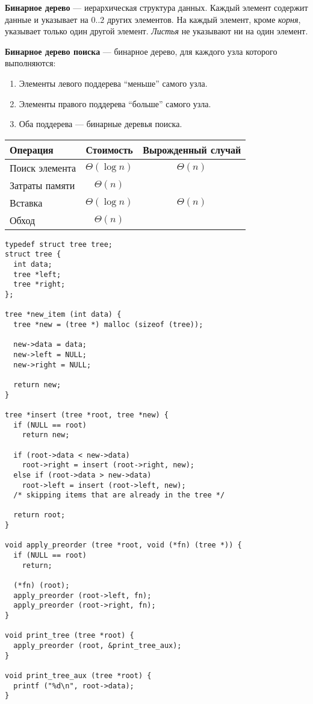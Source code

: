 \textbf{Бинарное дерево} --- иерархическая структура данных. Каждый элемент содержит данные и указывает на $0..2$ других элементов. На каждый элемент, кроме \emph{корня}, указывает только один другой элемент. \emph{Листья} не указывают ни на один элемент.

\textbf{Бинарное дерево поиска} --- бинарное дерево, для каждого узла которого выполняются:
\begin{enumerate}
  \item Элементы левого поддерева ``меньше'' самого узла.
  \item Элементы правого поддерева ``больше'' самого узла.
  \item Оба поддерева --- бинарные деревья поиска.
\end{enumerate}

\begin{center}
  \begin{tabular}{lcc}
    \toprule
    Операция & Стоимость & Вырожденный случай \\
    \midrule
    Поиск элемента & $\Theta(\log n)$ & $\Theta(n)$ \\
    Затраты памяти & $\Theta(n)$ & \\
    Вставка & $\Theta(\log n)$ & $\Theta(n)$ \\
    Обход & $\Theta(n)$ & \\
    \bottomrule
  \end{tabular}
\end{center}

\lstset{label=lst:bst-impl,caption=Некоторые операции}
\begin{lstlisting}
typedef struct tree tree;
struct tree {
  int data;
  tree *left;
  tree *right;
};

tree *new_item (int data) {
  tree *new = (tree *) malloc (sizeof (tree));

  new->data = data;
  new->left = NULL;
  new->right = NULL;

  return new;
}

tree *insert (tree *root, tree *new) {
  if (NULL == root)
    return new;

  if (root->data < new->data)
    root->right = insert (root->right, new);
  else if (root->data > new->data)
    root->left = insert (root->left, new);
  /* skipping items that are already in the tree */

  return root;
}

void apply_preorder (tree *root, void (*fn) (tree *)) {
  if (NULL == root)
    return;

  (*fn) (root);
  apply_preorder (root->left, fn);
  apply_preorder (root->right, fn);
}

void print_tree (tree *root) {
  apply_preorder (root, &print_tree_aux);
}

void print_tree_aux (tree *root) {
  printf ("%d\n", root->data);
}
\end{lstlisting}

